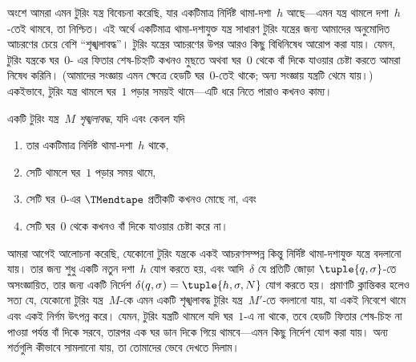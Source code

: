 \documentclass[../../../include/open-logic-section]{subfiles}
\begin{document}

\begin{explain}
 অংশে আমরা এমন টুরিং যন্ত্র বিবেচনা করেছি, যার একটিমাত্র
নির্দিষ্ট থামা-দশা~$h$ আছে—এমন যন্ত্র থামলে দশা~$h$-তেই থামবে, তা
নিশ্চিত। এই অর্থে একটিমাত্র থামা-দশাযুক্ত যন্ত্র সাধারণ টুরিং যন্ত্রের
জন্য আমাদের অনুমোদিত আচরণের চেয়ে বেশি ``শৃঙ্খলাবদ্ধ''। টুরিং যন্ত্রের
আচরণের উপর আরও কিছু বিধিনিষেধ আরোপ করা যায়। যেমন, টুরিং যন্ত্রকে ঘর~$0$-
এর ফিতার শেষ-চিহ্নটি কখনও মুছতে অথবা ঘর~$0$ থেকে বাঁ দিকে যাওয়ার চেষ্টা
করতে আমরা নিষেধ করিনি। (আমাদের সংজ্ঞায় এমন ক্ষেত্রে হেডটি ঘর~$0$-তেই
থাকে; অন্য সংজ্ঞায় যন্ত্রটি থেমে যায়।) একইভাবে, টুরিং যন্ত্র থামলে
ঘর~$1$ পড়ার সময়ই থামে—এটি ধরে নিতে পারাও কখনও কাম্য।
\end{explain}

\begin{defn}
একটি টুরিং যন্ত্র~$M$ \emph{শৃঙ্খলাবদ্ধ}, যদি এবং কেবল যদি
\begin{enumerate}
    \item তার একটিমাত্র নির্দিষ্ট থামা-দশা~$h$ থাকে,
    \item সেটি থামলে ঘর~$1$ পড়ার সময় থামে,
    \item সেটি ঘর~$0$-এর $\TMendtape$ প্রতীকটি কখনও মোছে না, এবং
    \item সেটি ঘর~$0$ থেকে কখনও বাঁ দিকে যাওয়ার চেষ্টা করে না।
\end{enumerate}
\end{defn}

\begin{explain}
আমরা আগেই আলোচনা করেছি, যেকোনো টুরিং যন্ত্রকে একই আচরণসম্পন্ন কিন্তু
নির্দিষ্ট থামা-দশাযুক্ত যন্ত্রে বদলানো যায়। তার জন্য শুধু একটি নতুন
দশা~$h$ যোগ করতে হয়, এবং আদি~$\delta$ যে প্রতিটি জোড়া
$\tuple{q,\sigma}$-তে অসংজ্ঞায়িত, তার জন্য একটি নির্দেশ
$\delta(q, \sigma) = \tuple{h, \sigma, N}$ যোগ করতে হয়। প্রমাণটি
ক্লান্তিকর হলেও সত্য যে, যেকোনো টুরিং যন্ত্র~$M$-কে এমন একটি
শৃঙ্খলাবদ্ধ টুরিং যন্ত্র~$M'$-তে বদলানো যায়, যা একই নিবেশে থামে এবং একই
নির্গম উৎপন্ন করে। যেমন, টুরিং যন্ত্রটি থামলে যদি ঘর~$1$-এ না থাকে, তবে
হেডটি ফিতার শেষ-চিহ্ন না পাওয়া পর্যন্ত বাঁ দিকে সরবে, তারপর এক ঘর ডান
দিকে গিয়ে থামবে—এমন কিছু নির্দেশ যোগ করা যায়। অন্য শর্তগুলি কীভাবে
সামলানো যায়, তা তোমাদের ভেবে দেখতে দিলাম।
\end{explain}
\end{document}
